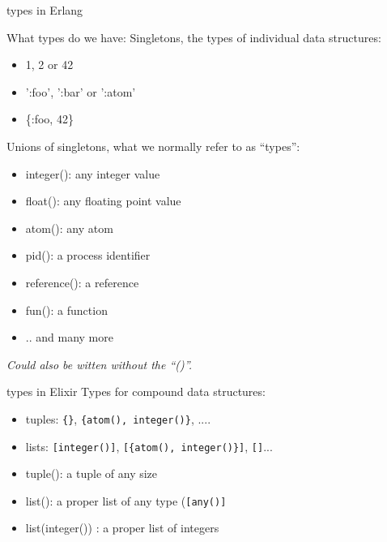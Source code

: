 \begin{frame}{types in Erlang}

What types do we have:
\pause\vspace{10pt}
Singletons, the types of individual data structures:
\begin{itemize}
\item  1, 2 or 42
\item ':foo', ':bar' or ':atom'
\item  \{:foo, 42\}
\end{itemize}
\pause\vspace{10pt}
Unions of singletons, what we normally refer to as ``types'':
\begin{itemize}
\item integer(): any integer value 
\item float(): any floating point value 
\item atom(): any atom 
\item pid(): a process identifier
\item reference(): a reference
\item fun(): a function 
\item .. and many more
\end{itemize}

{\em Could also be witten without the ``()''. }
\end{frame}

\begin{frame}{types in Elixir}
Types for compound data structures:
\pause\vspace{10pt}
\begin{itemize}
\item  tuples: {\tt \{\}}, {\tt \{atom(), integer()\}}, ....
\item  lists: {\tt [integer()]}, {\tt [\{atom(), integer()\}]}, {\tt []}... \pause
\end{itemize}

\begin{itemize}
\item  tuple(): a tuple of any size \pause
\item  list(): a proper list of any type ({\tt [any()]} \pause
\item  list(integer()) : a proper list of integers \pause
\end{itemize} \pause

\end{frame}


